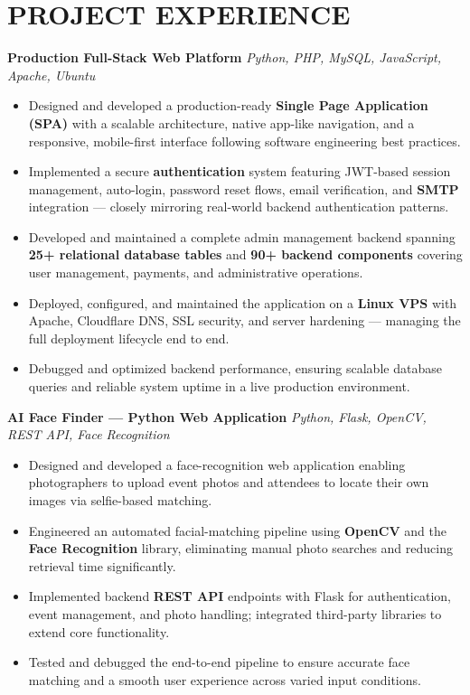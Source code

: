 \documentclass[10.5pt,a4paper]{article}
\newcommand{\role}[2]{\textbf{#1} \hfill \textit{#2}}
\begin{document}
\section*{PROJECT EXPERIENCE}

\role{Production Full-Stack Web Platform}{Python, PHP, MySQL, JavaScript, Apache, Ubuntu}
\begin{itemize}
\item Designed and developed a production-ready \textbf{Single Page Application (SPA)} with a scalable architecture, native app-like navigation, and a responsive, mobile-first interface following software engineering best practices.
\item Implemented a secure \textbf{authentication} system featuring JWT-based session management, auto-login, password reset flows, email verification, and \textbf{SMTP} integration — closely mirroring real-world backend authentication patterns.
\item Developed and maintained a complete admin management backend spanning \textbf{25+ relational database tables} and \textbf{90+ backend components} covering user management, payments, and administrative operations.
\item Deployed, configured, and maintained the application on a \textbf{Linux VPS} with Apache, Cloudflare DNS, SSL security, and server hardening — managing the full deployment lifecycle end to end.
\item Debugged and optimized backend performance, ensuring scalable database queries and reliable system uptime in a live production environment.
\end{itemize}

\role{AI Face Finder — Python Web Application}{Python, Flask, OpenCV, REST API, Face Recognition}
\begin{itemize}
\item Designed and developed a face-recognition web application enabling photographers to upload event photos and attendees to locate their own images via selfie-based matching.
\item Engineered an automated facial-matching pipeline using \textbf{OpenCV} and the \textbf{Face Recognition} library, eliminating manual photo searches and reducing retrieval time significantly.
\item Implemented backend \textbf{REST API} endpoints with Flask for authentication, event management, and photo handling; integrated third-party libraries to extend core functionality.
\item Tested and debugged the end-to-end pipeline to ensure accurate face matching and a smooth user experience across varied input conditions.
\end{itemize}
\end{document}
